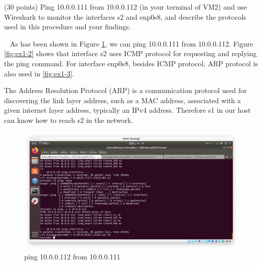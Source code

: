 \begin{exercise}[]{(30 points) Ping 10.0.0.111 from 10.0.0.112 (in your terminal of VM2) and use Wireshark to monitor the interfaces s2 and enp0s8, and describe the protocols used in this procedure and your findings.}
  \begin{solution}
  \par{~}
  As has been shown in Figure \ref{fig:ex1-1}, we can ping 10.0.0.111 from 10.0.0.112. Figure \ref{fig:ex1-2} shows that interface s2 uses ICMP protocol for requesting and replying the ping command. For interface enp0s8, besides ICMP protocol, ARP protocol is also used in \ref{fig:ex1-3}.
  
  The Address Resolution Protocol (ARP) is a communication protocol used for discovering the link layer address, such as a MAC address, associated with a given internet layer address, typically an IPv4 address. Therefore s1 in our host can know how to reach s2 in the network.
  \begin{figure}[ht]
    \begin{center}
    \includegraphics[width=12cm]{img/lab4/ex1-1.png}
    \caption{ping 10.0.0.112 from 10.0.0.111}
    \label{fig:ex1-1}
    \end{center}
  \end{figure}


\end{solution}
\end{exercise}
